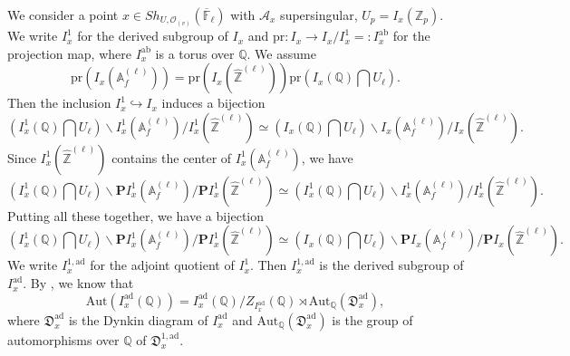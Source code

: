 \documentclass[11pt,oneside,reqno]{amsart}
\newcommand{\ab}{\mathrm{ab}}
\newcommand{\ad}{\mathrm{ad}}
\newcommand{\proj}{\mathrm{pr}}
\newcommand{\Aut}{\mathrm{Aut}}
\newcommand{\A}{\mathbb{A}}
\newcommand{\F}{\mathbb{F}}
\newcommand{\Q}{\mathbb{Q}}
\newcommand{\Z}{\mathbb{Z}}
\newcommand{\Acal}{\mathcal{A}}
\newcommand{\Ocal}{\mathcal{O}}
\newcommand{\Pbf}{\mathbf{P}}
\newcommand{\Dfrak}{\mathfrak{D}}
\theoremstyle{plain}
\begin{document}
	
	
	We consider a point $x\in Sh_{U,\Ocal_{(v)}}(\overline{\F}_\ell)$ with $\Acal_x$ supersingular, $U_p=I_x(\Z_p)$. We write $I_x^1$ for the derived subgroup of $I_x$ and $\proj\colon I_x\to I_x/I_x^1=:I_x^\ab$ for the projection map, where $I_x^\ab$ is a torus over $\Q$. We assume
	\begin{equation}\label{condition on similitude of I_x}
		\proj(I_x(\A_f^{(\ell)}))
		=
		\proj(I_x(\widehat{\Z}^{(\ell)}))\proj(I_x(\Q)\bigcap U_\ell).
	\end{equation}
	Then the inclusion $I_x^1\hookrightarrow I_x$ induces a bijection
	\begin{equation}\label{I_x and I_x^1}
		(I_x^1(\Q)\bigcap U_\ell)\backslash I_x^1(\A_f^{(\ell)})/I_x^1(\widehat{\Z}^{(\ell)})
		\simeq
		(I_x(\Q)\bigcap U_\ell)\backslash I_x(\A_f^{(\ell)})/I_x(\widehat{\Z}^{(\ell)}).
	\end{equation}
	Since $I_x^1(\widehat{\Z}^{(\ell)})$ contains the center of $I_x^1(\A_f^{(\ell)})$, we have
	\begin{equation}\label{I_x^1 and PI_x^1}
		(I_x^1(\Q)\bigcap U_\ell)\backslash\Pbf I_x^1(\A_f^{(\ell)})/\Pbf I_x^1(\widehat{\Z}^{(\ell)})
		\simeq
		(I_x^1(\Q)\bigcap U_\ell)\backslash I_x^1(\A_f^{(\ell)})/I_x^1(\widehat{\Z}^{(\ell)}).
	\end{equation}
	Putting all these together, we have a bijection
	\begin{equation}\label{PI_x^1 vs PI_x}
		(I_x^1(\Q)\bigcap U_\ell)\backslash\Pbf I_x^1(\A_f^{(\ell)})/\Pbf I_x^1(\widehat{\Z}^{(\ell)})
		\simeq
		(I_x(\Q)\bigcap U_\ell)\backslash\Pbf I_x(\A_f^{(\ell)})/\Pbf I_x(\widehat{\Z}^{(\ell)}).
	\end{equation}
	We write $I_x^{1,\ad}$ for the adjoint quotient of $I_x^1$. Then $I_x^{1,\ad}$ is the derived subgroup of $I_x^\ad$. By \cite{Humphreys1969}, we know that
	\begin{equation*}
		\Aut(I_x^{\ad}(\Q))=I_x^{\ad}(\Q)/Z_{I_x^{\ad}}(\Q)\rtimes\Aut_\Q(\Dfrak_x^{\ad}),
	\end{equation*}
	where $\Dfrak_x^{\ad}$ is the Dynkin diagram of $I_x^{\ad}$ and $\Aut_\Q(\Dfrak_x^{\ad})$ is the group of automorphisms over $\Q$ of $\Dfrak_x^{1,\ad}$.
	
	
	
	
	
	
	
\end{document}
